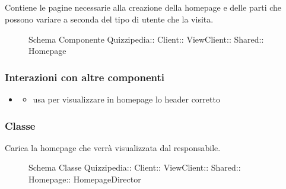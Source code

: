 \subsection{}
Contiene le pagine necessarie alla creazione della homepage e delle parti che possono variare a seconda del tipo di utente che la visita.
\begin{figure}[H]
\centering
\noindent{}
\caption[Schema Componente Homepage]{Schema Componente Quizzipedia:: Client:: ViewClient:: Shared:: Homepage}
\end{figure}
\subsubsection{Interazioni con altre componenti}
\begin{itemize}
\item {}
\begin{itemize}
\item usa  per visualizzare in homepage lo header corretto
\end{itemize}
\end{itemize}
\subsubsection{Classe }
Carica la homepage che verrà visualizzata dal responsabile.
\begin{figure}[H]
\centering
\noindent{}
\caption[Schema Classe HomepageDirector]{Schema Classe Quizzipedia:: Client:: ViewClient:: Shared:: Homepage:: HomepageDirector}
\end{figure}

